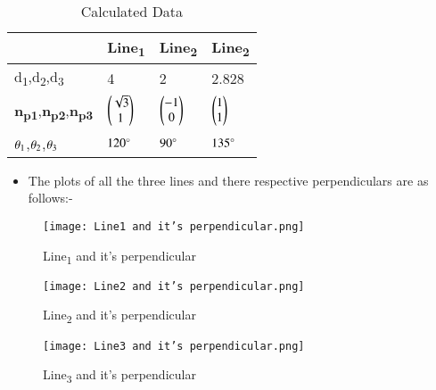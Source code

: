 \documentclass[journal,12pt,twocolumn]{IEEEtran}
\begin{document}
\begin{table}[!ht]
\begin{center}
\begin{tabular}{ | m{2cm} | m{1.2cm}| m{1.2cm} | m{1.2cm} |} 
\hline
 & Line\textsubscript{1} & Line\textsubscript{2} & Line\textsubscript{2} \\
\hline
d\textsubscript{1},d\textsubscript{2},d\textsubscript{3} & 4 & 2 & 2.828 \\ 
\hline
\textbf{n\textsubscript{p1}},\textbf{n\textsubscript{p2}},\textbf{n\textsubscript{p3}} & $\begin{pmatrix}\sqrt{3}\\1\end{pmatrix}$ & $\begin{pmatrix}-1\\0\end{pmatrix}$ & $\begin{pmatrix}1\\1\end{pmatrix}$ \\ 
\hline
$\theta\textsubscript{1}$,$\theta\textsubscript{2}$,$\theta\textsubscript{3}$& $120\degree$ & $90\degree$ & $135\degree$ \\ 
\hline
\end{tabular}
\end{center}
\caption{Calculated Data}
\label{tab:table2}
\end{table}
\begin{itemize}
\item The plots of all the three lines and there respective perpendiculars are as follows:-
\end{itemize}
\begin{figure}[H]
\centering
\texttt{[image: Line1 and it's perpendicular.png]}
\caption{Line\textsubscript{1} and it's perpendicular}
\label{fig:circle}	
\end{figure}
\begin{figure}[H]
\centering
\texttt{[image: Line2 and it's perpendicular.png]}
\caption{Line\textsubscript{2} and it's perpendicular}
\label{fig:circle}	
\end{figure}
\begin{figure}[H]
\centering
\texttt{[image: Line3 and it's perpendicular.png]}
\caption{Line\textsubscript{3} and it's perpendicular}
\label{fig:circle}	
\end{figure}
\end{document}
